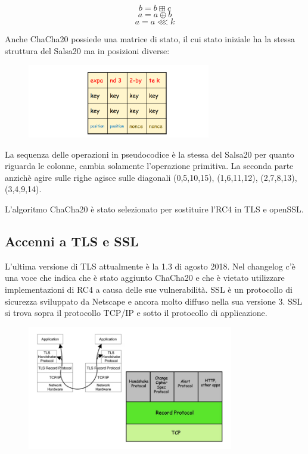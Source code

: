 \[ b = b \boxplus c\]
\[a = a \oplus b\]
\[a = a \lll k\]

Anche ChaCha20 possiede una matrice di stato, il cui stato iniziale ha la stessa struttura del Salsa20 ma in posizioni diverse:

\begin{figure}[htb!]
    \centering
    \includegraphics[width=8cm]{./Images/cap1/1.40.png}
\end{figure} 

La sequenza delle operazioni in pseudocodice è la stessa del Salsa20 per quanto riguarda le colonne, cambia solamente l'operazione primitiva. La seconda parte anzichè agire sulle righe agisce sulle diagonali (0,5,10,15), (1,6,11,12), (2,7,8,13), (3,4,9,14). 

L'algoritmo ChaCha20 è stato selezionato per sostituire l'RC4 in TLS e openSSL.

\subsection{Accenni a TLS e SSL}
L'ultima versione di TLS attualmente è la 1.3 di agosto 2018. Nel changelog c'è una voce che indica che è stato aggiunto ChaCha20 e che è vietato utilizzare implementazioni di RC4 a causa delle sue vulnerabilità. SSL è un protocollo di sicurezza sviluppato da Netscape e ancora molto diffuso nella sua versione 3. SSL si trova sopra il protocollo TCP/IP e sotto il protocollo di applicazione. 

\begin{figure}[htb!]
    \centering
    \includegraphics[width=9cm]{./Images/cap1/1.41.png}
\end{figure} 

